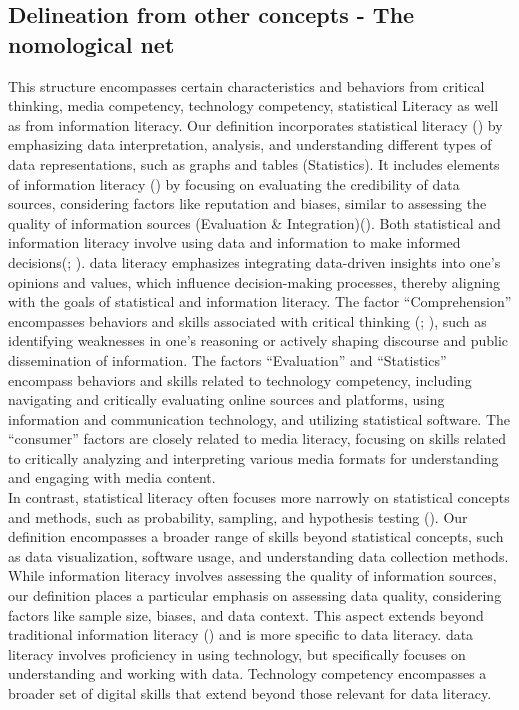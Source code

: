 \documentclass[
  12pt,
  a4paper,
  twoside]{article}
\begin{document}
\subsection{Delineation from other concepts - The nomological net}\label{delineation-from-other-concepts---the-nomological-net}

This structure encompasses certain characteristics and behaviors from critical thinking, media competency, technology competency, statistical Literacy as well as from information literacy.
Our definition incorporates statistical literacy () by emphasizing data interpretation, analysis, and understanding different types of data representations, such as graphs and tables (Statistics). It includes elements of information literacy () by focusing on evaluating the credibility of data sources, considering factors like reputation and biases, similar to assessing the quality of information sources (Evaluation \& Integration)(). Both statistical and information literacy involve using data and information to make informed decisions(; ). data literacy emphasizes integrating data-driven insights into one's opinions and values, which influence decision-making processes, thereby aligning with the goals of statistical and information literacy. The factor ``Comprehension'' encompasses behaviors and skills associated with critical thinking (; ), such as identifying weaknesses in one's reasoning or actively shaping discourse and public dissemination of information. The factors ``Evaluation'' and ``Statistics'' encompass behaviors and skills related to technology competency, including navigating and critically evaluating online sources and platforms, using information and communication technology, and utilizing statistical software. The ``consumer'' factors are closely related to media literacy, focusing on skills related to critically analyzing and interpreting various media formats for understanding and engaging with media content.\\
In contrast, statistical literacy often focuses more narrowly on statistical concepts and methods, such as probability, sampling, and hypothesis testing (). Our definition encompasses a broader range of skills beyond statistical concepts, such as data visualization, software usage, and understanding data collection methods. While information literacy involves assessing the quality of information sources, our definition places a particular emphasis on assessing data quality, considering factors like sample size, biases, and data context. This aspect extends beyond traditional information literacy () and is more specific to data literacy. data literacy involves proficiency in using technology, but specifically focuses on understanding and working with data. Technology competency encompasses a broader set of digital skills that extend beyond those relevant for data literacy.
\end{document}
